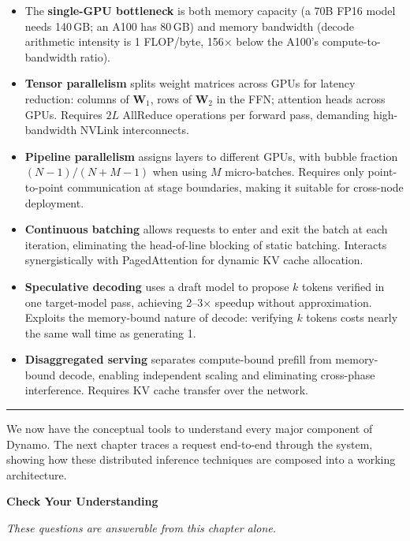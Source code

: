 \begin{itemize}
  \item The \textbf{single-GPU bottleneck} is both memory capacity (a 70B FP16 model needs 140\,GB; an A100 has 80\,GB) and memory bandwidth (decode arithmetic intensity is 1 FLOP/byte, 156$\times$ below the A100's compute-to-bandwidth ratio).
  \item \textbf{Tensor parallelism} splits weight matrices across GPUs for latency reduction: columns of $\mathbf{W}_1$, rows of $\mathbf{W}_2$ in the FFN; attention heads across GPUs. Requires $2L$ AllReduce operations per forward pass, demanding high-bandwidth NVLink interconnects.
  \item \textbf{Pipeline parallelism} assigns layers to different GPUs, with bubble fraction $(N-1)/(N+M-1)$ when using $M$ micro-batches. Requires only point-to-point communication at stage boundaries, making it suitable for cross-node deployment.
  \item \textbf{Continuous batching} allows requests to enter and exit the batch at each iteration, eliminating the head-of-line blocking of static batching. Interacts synergistically with PagedAttention for dynamic KV cache allocation.
  \item \textbf{Speculative decoding} uses a draft model to propose $k$ tokens verified in one target-model pass, achieving 2--3$\times$ speedup without approximation. Exploits the memory-bound nature of decode: verifying $k$ tokens costs nearly the same wall time as generating 1.
  \item \textbf{Disaggregated serving} separates compute-bound prefill from memory-bound decode, enabling independent scaling and eliminating cross-phase interference. Requires KV cache transfer over the network.
\end{itemize}

\medskip
\begin{center}\rule{0.5\linewidth}{0.4pt}\end{center}
\medskip

We now have the conceptual tools to understand every major component of Dynamo. The next chapter traces a request end-to-end through the system, showing how these distributed inference techniques are composed into a working architecture.

\medskip
\noindent\textbf{Check Your Understanding}

\smallskip
\noindent\emph{These questions are answerable from this chapter alone.}

